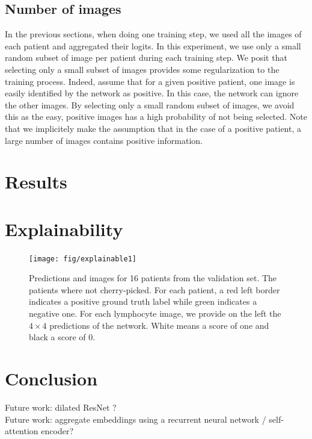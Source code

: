 \documentclass[final]{cvpr}
\begin{document}
\subsection{Number of images}
In the previous sections, when doing one training step, we used all the images of each patient and aggregated their logits.
In this experiment, we use only a small random subset of image per patient during each training step. 
We posit that selecting only a small subset of images provides some regularization to the training process. Indeed, assume that for a given positive patient, one image is easily identified by the network as positive. In this case, the network can ignore the other images. By selecting only a small random subset of images, we avoid this as the easy, positive images has a high probability of not being selected. Note that we implicitely make the assumption that in the case of a positive patient, a large number of images contains positive information.

	\section{Results}
	
	\section{Explainability}
	\begin{figure}[t]
		\begin{center}
			\texttt{[image: fig/explainable1]}
		\end{center}
		\caption{Predictions and images for 16 patients from the validation set. The patients where not cherry-picked. For each patient, a red left border indicates a positive ground truth label while green indicates a negative one. For each lymphocyte image, we provide on the left the $4\times 4$ predictions of the network. White means a score of one and black a score of 0.}
		\label{fig:resnet}
	\end{figure}
	
	\section{Conclusion}
	Future work: dilated ResNet ?\\
	Future work: aggregate embeddings using a recurrent neural network / self-attention encoder?
	
	{\small
		
		
	}
\end{document}
